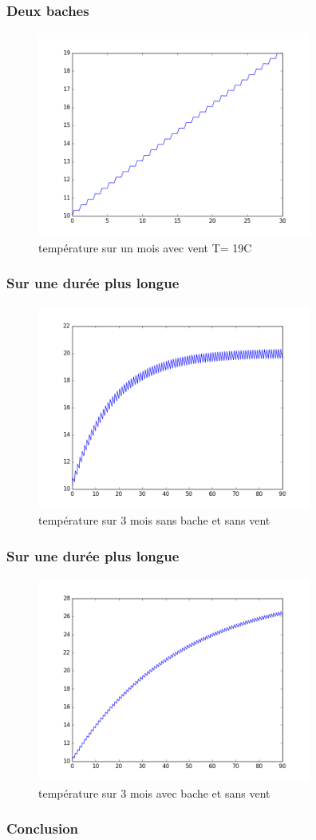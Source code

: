 \documentclass{beamer}
\begin{document}
  \begin{frame}
  \frametitle{Deux baches}
   \begin{figure}[ht!]
    \centering
    \includegraphics[width=90mm]{2b_v.png}
    \caption{température sur un mois avec vent T= 19C \label{overflow}}
   \end{figure}
  \end{frame}
  \begin{frame}
   \frametitle{Sur une durée plus longue}
   \begin{figure}[ht!]
    \centering
    \includegraphics[width=90mm]{0b_sv_3mois.png}
    \caption{température sur 3 mois sans bache et sans vent  \label{overflow}}
   \end{figure}
  \end{frame}
  \begin{frame}
   \frametitle{Sur une durée plus longue}
   \begin{figure}[ht!]
    \centering
    \includegraphics[width=90mm]{1b_sv_3mois.png}
    \caption{température sur 3 mois avec bache et sans vent  \label{overflow}}
   \end{figure}
  \end{frame}


  \begin{frame}
   \frametitle{Conclusion}
  \end{frame}



\end{document}
